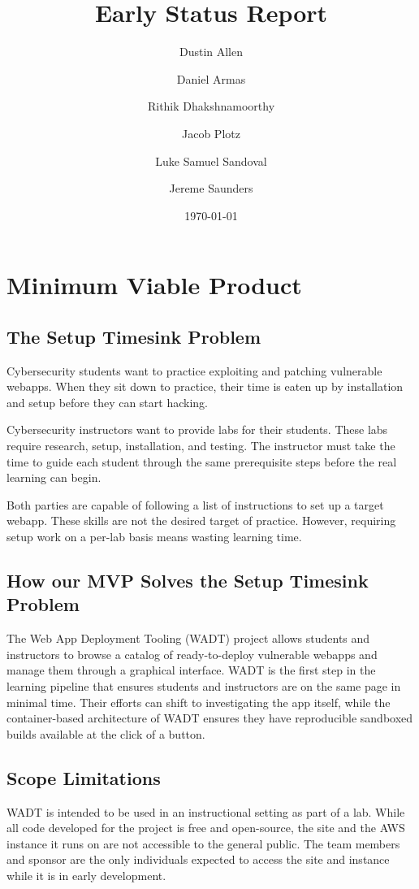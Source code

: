 \documentclass[12pt]{article}
\title{Early Status Report}
\author{
	Dustin Allen
	\and
	Daniel Armas
	\and
	Rithik Dhakshnamoorthy
	\and
	Jacob Plotz
	\and
	Luke Samuel Sandoval
	\and
	Jereme Saunders
}
\date{\today}
\begin{document}
\maketitle

\section{Minimum Viable Product}

\subsection{The Setup Timesink Problem}
Cybersecurity students want to practice exploiting and patching vulnerable webapps. When they sit down to practice, their time is eaten up by installation and setup before they can start hacking.

Cybersecurity instructors want to provide labs for their students. These labs require research, setup, installation, and testing. The instructor must take the time to guide each student through the same prerequisite steps before the real learning can begin.

Both parties are capable of following a list of instructions to set up a target webapp. These skills are not the desired target of practice. However, requiring setup work on a per-lab basis means wasting learning time.

\subsection{How our MVP Solves the Setup Timesink Problem}
The Web App Deployment Tooling (WADT) project allows students and instructors to browse a catalog of ready-to-deploy vulnerable webapps and manage them through a graphical interface. WADT is the first step in the learning pipeline that ensures students and instructors are on the same page in minimal time. Their efforts can shift to investigating the app itself, while the container-based architecture of WADT ensures they have reproducible sandboxed builds available at the click of a button.


\subsection{Scope Limitations}
WADT is intended to be used in an instructional setting as part of a lab. While all code developed for the project is free and open-source, the site and the AWS instance it runs on are not accessible to the general public. The team members and sponsor are the only individuals expected to access the site and instance while it is in early development.
\end{document}
